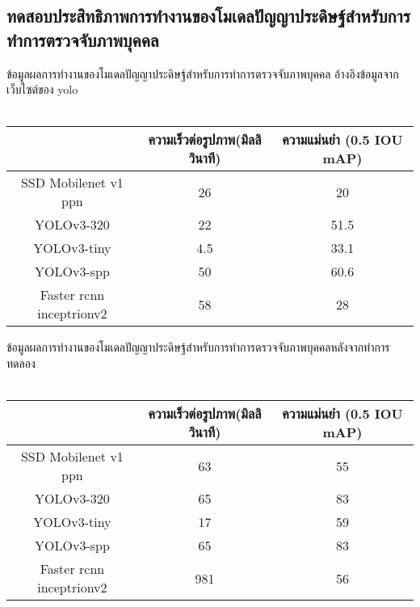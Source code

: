 
\subsection{ทดสอบประสิทธิภาพการทำงานของโมเดลปัญญาประดิษฐ์สำหรับการทำการตรวจจับภาพบุคคล}
 ข้อมูลผลการทำงานของโมเดลปัญญาประดิษฐ์สำหรับการทำการตรวจจับภาพบุคคล อ้างอิงข้อมูลจากเว็บไซต์ของ yolo			\\
\\
\begin{tabular}{|c|c|c|}
		\hline
		{}&{ความเร็วต่อรูปภาพ(มิลลิวินาที)}&{ความแม่นยำ (0.5 IOU mAP)}			\\
		\hline
		SSD Mobilenet v1 ppn	 		& 26				& 20														\\
		YOLOv3-320				& 22				& 51.5				\\	
		YOLOv3-tiny				& 4.5				& 33.1				\\
		YOLOv3-spp				& 50				& 60.6				\\	
		Faster rcnn inceptrionv2		& 58				& 28		\\
	\hline
\end{tabular}

ข้อมูลผลการทำงานของโมเดลปัญญาประดิษฐ์สำหรับการทำการตรวจจับภาพบุคคลหลังจากทำการทดลอง
\\\\
\begin{tabular}{|c|c|c|}
		\hline 
		{}&{ความเร็วต่อรูปภาพ(มิลลิวินาที)}&{ความแม่นยำ (0.5 IOU mAP)}			\\
		\hline
		SSD Mobilenet v1 ppn	 					& 63 			& 55			\\
		YOLOv3-320							& 65			& 83			\\
		YOLOv3-tiny							& 17			& 59			\\
		YOLOv3-spp							& 65			& 83			\\	
		Faster rcnn inceptrionv2					& 981		& 56			\\
	\hline
\end{tabular}
